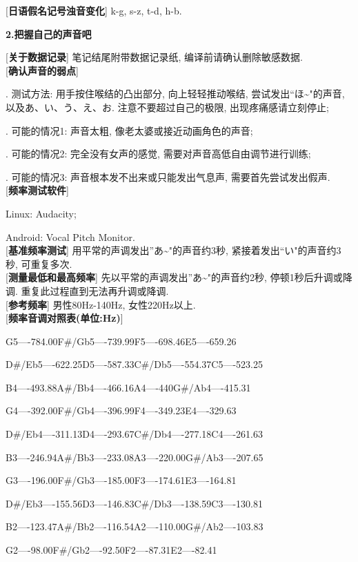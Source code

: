[\textbf{日语假名记号浊音变化}] k-g, s-z, t-d, h-b.

\clearpage

\begin{center}
 \textbf{2.把握自己的声音吧}
\end{center}

[\textbf{关于数据记录}] 笔记结尾附带数据记录纸, 编译前请确认删除敏感数据.\\

[\textbf{确认声音的弱点}]\par
{}. 测试方法: 用手按住喉结的凸出部分, 向上轻轻推动喉结, 尝试发出``ほ\textasciitilde"的声音, 以及あ、い、う、え、お. 注意不要超过自己的极限, 出现疼痛感请立刻停止;\par
{}. 可能的情况1: 声音太粗, 像老太婆或接近动画角色的声音;\par
{}. 可能的情况2: 完全没有女声的感觉, 需要对声音高低自由调节进行训练;\par
{}. 可能的情况3: 声音根本发不出来或只能发出气息声, 需要首先尝试发出假声.\\

[\textbf{频率测试软件}] \par
\qquad Linux: Audacity;\par
\qquad Android: Vocal Pitch Monitor.\\

[\textbf{基准频率测试}] 用平常的声调发出''あ\textasciitilde"的声音约3秒, 紧接着发出``い"的声音约3秒, 可重复多次.\\

[\textbf{测量最低和最高频率}] 先以平常的声调发出''あ\textasciitilde"的声音约2秒, 停顿1秒后升调或降调. 重复此过程直到无法再升调或降调.\\

[\textbf{参考频率}] 男性80Hz-140Hz, 女性220Hz以上.\\

[\textbf{频率音调对照表(单位:Hz)}]\par
\qquad G5----784.00\qquad F\#/Gb5----739.99\qquad F5----698.46\qquad E5----659.26\par
\qquad D\#/Eb5----622.25\qquad D5----587.33\qquad C\#/Db5----554.37\qquad C5----523.25\par
\qquad B4----493.88\qquad A\#/Bb4----466.16\qquad A4----440\qquad G\#/Ab4----415.31\par
\qquad G4----392.00\qquad F\#/Gb4----396.99\qquad F4----349.23\qquad E4----329.63\par
\qquad D\#/Eb4----311.13\qquad D4----293.67\qquad C\#/Db4----277.18\qquad C4----261.63\par
\qquad B3----246.94\qquad A\#/Bb3----233.08\qquad A3----220.00\qquad G\#/Ab3----207.65\par
\qquad G3----196.00\qquad F\#/Gb3----185.00\qquad F3----174.61\qquad E3----164.81\par
\qquad D\#/Eb3----155.56\qquad D3----146.83\qquad C\#/Db3----138.59\qquad C3----130.81\par
\qquad B2----123.47\qquad A\#/Bb2----116.54\qquad A2----110.00\qquad G\#/Ab2----103.83\par
\qquad G2----98.00\qquad F\#/Gb2----92.50\qquad F2----87.31\qquad E2----82.41\\

